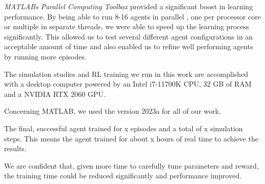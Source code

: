 \textit{MATLABs Parallel Computing Toolbox} provided a significant boost in learning performance.
By being able to run 8-16 agents in parallel , one per processor core or multiple in separate threads, we were able to speed up the learning process significantly.
This allowed us to test several different agent configurations in an acceptable amount of time and also enabled us to refine well performing agents by running more episodes.

The simulation studies and RL training we run in this work are accomplished with a desktop computer powered by an Intel i7-11700K CPU, 32 GB of RAM and a NVIDIA RTX 2060 GPU.

Concerning MATLAB, we used the version 2023a for all of our work.


The final, successful agent trained for x episodes and a total of x simulation steps. 
This means the agent trained for about x hours of real time to achieve the results.

We are confident that, given more time to carefully tune parameters and reward, the training time could be reduced significantly and performance improved.

